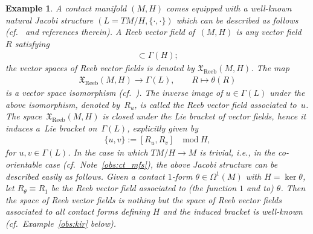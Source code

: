 \documentclass[pdftex]{sigma}
\numberwithin{equation}{section}
\newtheorem{Example}[Theorem]{Example}
\newcommand{\X}{\ensuremath{\mathfrak{X}}}
\newcommand{\CM}{(M,H)} %
\begin{document}
\begin{Example}\label{exm:ctc_jacobi}
A contact manifold $\CM$ comes equipped with a well-known natural Jacobi structure $(L = T M/H, \{\cdot,\cdot\})$ which can be described as follows (cf.~\cite{Maria-Crainic,Dazord} and references therein). A {\it Reeb vector field} of~$\CM$ is any vector f\/ield~$R$ satisfying
 \begin{gather*}[R,\Gamma(H)]\subset\Gamma(H);\end{gather*}
the vector spaces of Reeb vector f\/ields is denoted by $\X_{\mathrm{Reeb}}(M,H)$. The map
 \begin{gather*} %
 \X_{\mathrm{Reeb}}(M,H) \to \Gamma(L), \qquad R \mapsto \theta(R)
 \end{gather*}
is a vector space isomorphism (cf.\ \cite[Lemma~2.2 and Corollary~2.3]{Maria-Crainic}). The inverse image of $u\in\Gamma(L)$ under the above isomorphism, denoted by~$R_u$, is called the {\it Reeb vector field associated to~$u$}. The space~$\X_{\mathrm{Reeb}}(M,H)$ is closed under the Lie bracket of vector f\/ields, hence it induces a~Lie bracket on~$\Gamma(L)$, explicitly given by
 \begin{gather} \label{eq:2}
 \{u,v\} := [R_u,R_v] \quad \text{mod} \ H,
 \end{gather}
for $u,v \in \Gamma(L)$. In the case in which $TM/H \to M$ is trivial, i.e., in the co-orientable case (cf.\ Note~\ref{obs:ct_mfs}), the above Jacobi structure can be described easily as follows. Given a contact $1$-form $\theta \in \Omega^1(M)$ with $H = \ker \theta$, let $R_{\theta} \equiv R_1$ be {\em the} Reeb vector f\/ield associated to (the function $1$ and to) $\theta$. Then the space of Reeb vector f\/ields is nothing but the space of Reeb vector f\/ields associated to all contact forms def\/ining $H$ and the induced bracket is well-known (cf.\ Example~\ref{obs:kir} below).
\end{Example}
\end{document}
